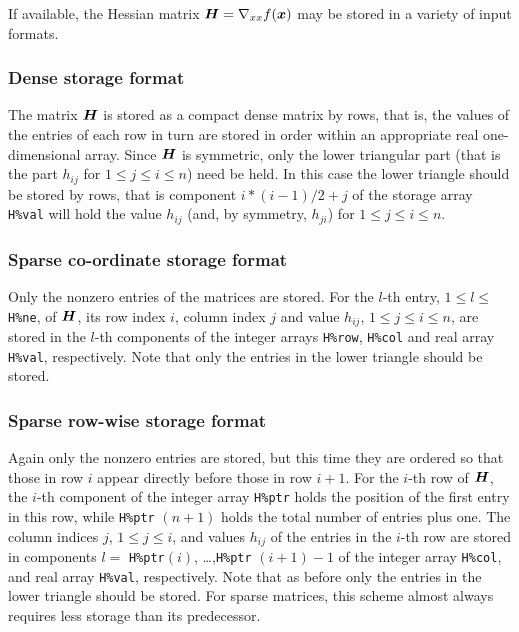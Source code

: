 \documentclass{galahad}
\begin{document}
\galmatrix
If available, the Hessian matrix ${\bm{H}} = \nabla_{xx} f({\bm{x}})$
may be stored in a variety of input formats.

\subsubsection{Dense storage format}\label{dense}
The matrix ${\bm{H}}$ is stored as a compact
dense matrix by rows, that is, the values of the entries of each row in turn are
stored in order within an appropriate real one-dimensional array.
Since ${\bm{H}}$ is symmetric, only the lower triangular part (that is the part
$h_{ij}$ for $1 \leq j \leq i \leq n$) need be held. In this case
the lower triangle should be stored by rows, that is
component $i \ast (i-1)/2 + j$ of the storage array {\tt H\%val}
will hold the value $h_{ij}$ (and, by symmetry, $h_{ji}$)
for $1 \leq j \leq i \leq n$.

\subsubsection{Sparse co-ordinate storage format}\label{coordinate}
Only the nonzero entries of the matrices are stored.
For the $l$-th entry, $1 \leq l \leq$ {\tt H\%ne}, of ${\bm{H}}$,
its row index $i$, column index $j$ and value $h_{ij}$,
$1 \leq j \leq i \leq n$,
are stored in the $l$-th components of the integer arrays {\tt H\%row},
{\tt H\%col} and real array {\tt H\%val}, respectively.
Note that only the entries in the lower triangle should be stored.

\subsubsection{Sparse row-wise storage format}\label{rowwise}
Again only the nonzero entries are stored, but this time
they are ordered so that those in row $i$ appear directly before those
in row $i+1$. For the $i$-th row of ${\bm{H}}$, the $i$-th component of the
integer array {\tt H\%ptr} holds the position of the first entry in this row,
while {\tt H\%ptr} $(n+1)$ holds the total number of entries plus one.
The column indices $j$, $1 \leq j \leq i$, and values $h_{ij}$ of the
entries in the $i$-th row are stored in components
$l =$ {\tt H\%ptr}$(i)$, \ldots ,{\tt H\%ptr} $(i+1)-1$ of the
integer array {\tt H\%col}, and real array {\tt H\%val}, respectively.
Note that as before only the entries in the lower triangle should be stored.
For sparse matrices, this scheme almost always requires less storage than
its predecessor.
\end{document}
